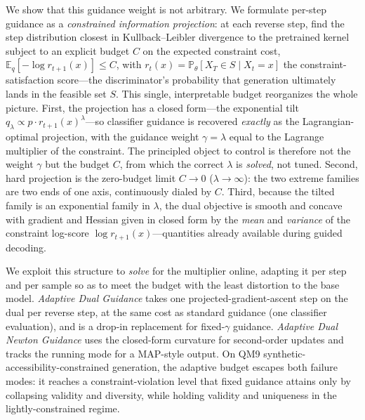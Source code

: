\documentclass{article}
\newcommand{\E}{\mathbb{E}}
\begin{document}
We show that this guidance weight is not arbitrary. We formulate per-step guidance as a \emph{constrained information projection}: at each reverse step, find the step distribution closest in Kullback--Leibler divergence to the pretrained kernel subject to an explicit budget $C$ on the expected constraint cost, $\E_q[-\log r_{t+1}(x)]\le C$, with $r_t(x)=\mathbb P_\theta[X_T\in S\mid X_t=x]$ the constraint-satisfaction score---the discriminator's probability that generation ultimately lands in the feasible set $S$. This single, interpretable budget reorganizes the whole picture. First, the projection has a closed form---the exponential tilt $q_\lambda\propto p\cdot r_{t+1}(x)^\lambda$---so classifier guidance is recovered \emph{exactly} as the Lagrangian-optimal projection, with the guidance weight $\gamma=\lambda$ equal to the Lagrange multiplier of the constraint. The principled object to control is therefore not the weight $\gamma$ but the budget $C$, from which the correct $\lambda$ is \emph{solved}, not tuned. Second, hard projection is the zero-budget limit $C\!\to\!0$ ($\lambda\!\to\!\infty$): the two extreme families are two ends of one axis, continuously dialed by $C$. Third, because the tilted family is an exponential family in $\lambda$, the dual objective is smooth and concave with gradient and Hessian given in closed form by the \emph{mean} and \emph{variance} of the constraint log-score $\log r_{t+1}(x)$---quantities already available during guided decoding.

We exploit this structure to \emph{solve} for the multiplier online, adapting it per step and per sample so as to meet the budget with the least distortion to the base model. \emph{Adaptive Dual Guidance} takes one projected-gradient-ascent step on the dual per reverse step, at the same cost as standard guidance (one classifier evaluation), and is a drop-in replacement for fixed-$\gamma$ guidance. \emph{Adaptive Dual Newton Guidance} uses the closed-form curvature for second-order updates and tracks the running mode for a MAP-style output. On QM9 synthetic-accessibility-constrained generation, the adaptive budget escapes both failure modes: it reaches a constraint-violation level that fixed guidance attains only by collapsing validity and diversity, while holding validity and uniqueness in the lightly-constrained regime.
\end{document}
